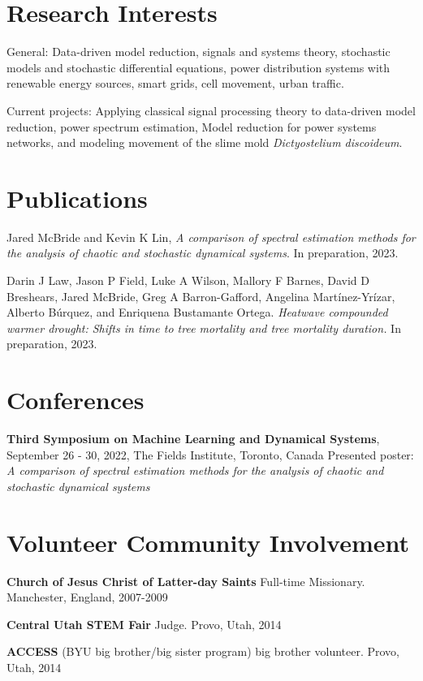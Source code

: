 \documentclass{article}
\begin{document}
\section*{Research Interests}
General: Data-driven model reduction, signals and systems theory, stochastic models and stochastic differential equations, power distribution systems with renewable energy sources, smart grids, cell movement, urban traffic.

Current projects: Applying classical signal processing theory to data-driven model reduction, power spectrum estimation, Model reduction for power systems networks, and modeling movement of the slime mold \emph{Dictyostelium discoideum}.

\section*{Publications}
Jared McBride and Kevin K Lin, \emph{A comparison of spectral estimation methods for the analysis of chaotic and stochastic dynamical systems}. In preparation, 2023.

Darin J Law, Jason P Field, Luke A Wilson, Mallory F Barnes, David D Breshears, Jared McBride, Greg A Barron-Gafford, Angelina Martínez-Yrízar, Alberto Búrquez, and Enriquena Bustamante Ortega. \emph{Heatwave compounded warmer drought: Shifts in time to tree mortality and tree mortality duration.} In preparation, 2023.

\section*{Conferences}
\textbf{Third Symposium on Machine Learning and Dynamical Systems}, September 26 - 30, 2022, The Fields Institute, Toronto, Canada\newline
Presented poster: \emph{A comparison of spectral estimation methods for the analysis of chaotic and stochastic dynamical systems}

\section*{Volunteer Community Involvement}
\textbf{Church of Jesus Christ of Latter-day Saints} Full-time Missionary. Manchester, England, 2007-2009

\textbf{Central Utah STEM Fair} Judge. Provo, Utah, 2014

\textbf{ACCESS} (BYU big brother/big sister program) big brother volunteer. Provo, Utah, 2014
\end{document}
